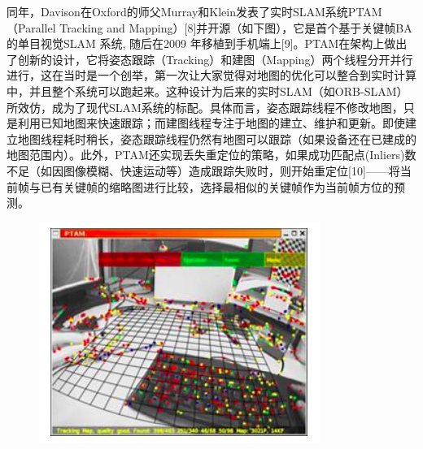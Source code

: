 同年，Davison在Oxford的师父Murray和Klein发表了实时SLAM系统PTAM（Parallel Tracking and Mapping）[8]并开源（如下图），它是首个基于关键帧BA的单目视觉SLAM 系统, 随后在2009 年移植到手机端上[9]。PTAM在架构上做出了创新的设计，它将姿态跟踪（Tracking）和建图（Mapping）两个线程分开并行进行，这在当时是一个创举，第一次让大家觉得对地图的优化可以整合到实时计算中，并且整个系统可以跑起来。这种设计为后来的实时SLAM（如ORB-SLAM）所效仿，成为了现代SLAM系统的标配。具体而言，姿态跟踪线程不修改地图，只是利用已知地图来快速跟踪；而建图线程专注于地图的建立、维护和更新。即使建立地图线程耗时稍长，姿态跟踪线程仍然有地图可以跟踪（如果设备还在已建成的地图范围内）。此外，PTAM还实现丢失重定位的策略，如果成功匹配点(Inliers)数不足（如因图像模糊、快速运动等）造成跟踪失败时，则开始重定位[10]——将当前帧与已有关键帧的缩略图进行比较，选择最相似的关键帧作为当前帧方位的预测。
\begin{figure}[H]%
	\centering  %
	\includegraphics[width=0.7\linewidth]{image/Talk/9.png}  %

\end{figure}





